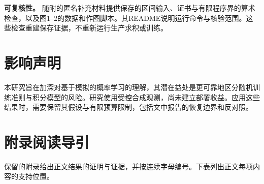 \documentclass[11pt,a4paper]{article}
\begin{document}
\textbf{可复核性。}
随附的匿名补充材料提供保存的区间输入、证书与有限程序界的算术检查，以及图1--2的数据和作图脚本。其README说明运行命令与核验范围。这些检查重建保存证据，不重新运行生产求积或训练。
\FloatBarrier
\label{candidateMainEnd}
\section*{影响声明}\label{ux5f71ux54cdux58f0ux660e}

本研究旨在加深对基于模拟的概率学习的理解，其潜在益处是更可靠地区分随机训练准则与积分模型的风险。研究使用受控合成观测，尚未建立部署收益。应用这些结果时，需要保留其假设与有限预算限制，包括文中报告的恢复边界和反对照。
\renewcommand{\refname}{参考文献}


\clearpage
\setcounter{secnumdepth}{0}
\setcounter{figure}{0}
\renewcommand{\thefigure}{S\arabic{figure}}
\section*{附录阅读导引}\label{ux9644ux5f55ux9605ux8bfbux5bfcux5f15}

保留的附录给出正文结果的证明与证据，并按连续字母编号。下表列出正文每项内容的支持位置。
\end{document}
